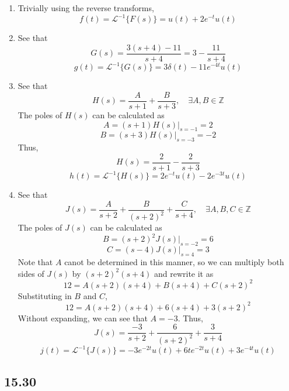 \documentclass{article}
\begin{document}
\begin{enumerate}[label=(\alph*)]
    \item Trivially using the reverse transforms, 
        $$f(t) = \mathcal{L}^{-1}\{F(s)\} = u(t) + 2e^{-t}u(t)$$
    \item See that $$G(s)=\frac{3(s+4)-11}{s+4}= 3 - \frac{11}{s+4}$$
        $$g(t) = \mathcal{L}^{-1}\{G(s)\} = 3\delta(t) - 11e^{-4t}u(t)$$
    \item See that $$H(s)=\frac{A}{s+1}+\frac{B}{s+3}, \quad \exists A,B \in \mathbb{Z}$$
        The poles of $H(s)$ can be calculated as 
        $$A=(s+1)H(s)\big|_{s=-1}=2$$
        $$B=(s+3)H(s)\big|_{s=-3}=-2$$
        Thus, $$H(s)=\frac{2}{s+1}-\frac{2}{s+3}$$
        $$h(t) = \mathcal{L}^{-1}\{H(s)\} = 2e^{-t}u(t) - 2e^{-3t}u(t)$$
    \item See that $$J(s)=\frac{A}{s+2}+\frac{B}{(s+2)^2}+\frac{C}{s+4}, \quad \exists A,B,C \in \mathbb{Z}$$
        The poles of $J(s)$ can be calculated as 
        $$B=(s+2)^2J(s)\big|_{s=-2}=6$$
        $$C=(s-4)J(s)\big|_{s=4}=3$$
        Note that $A$ canot be determined in this manner, so we can multiply both sides of $J(s)$ by $(s+2)^2(s+4)$ and rewrite it as
        $$12=A(s+2)(s+4)+B(s+4)+C(s+2)^2$$
        Substituting in $B$ and $C$,
        $$12=A(s+2)(s+4)+6(s+4)+3(s+2)^2$$
        Without expanding, we can see that $A=-3$. Thus,
        $$J(s)=\frac{-3}{s+2}+\frac{6}{(s+2)^2}+\frac{3}{s+4}$$
        $$j(t) = \mathcal{L}^{-1}\{J(s)\} = -3e^{-2t}u(t) + 6te^{-2t}u(t) + 3e^{-4t}u(t)$$

\end{enumerate}



\subsection*{15.30}
\end{document}
